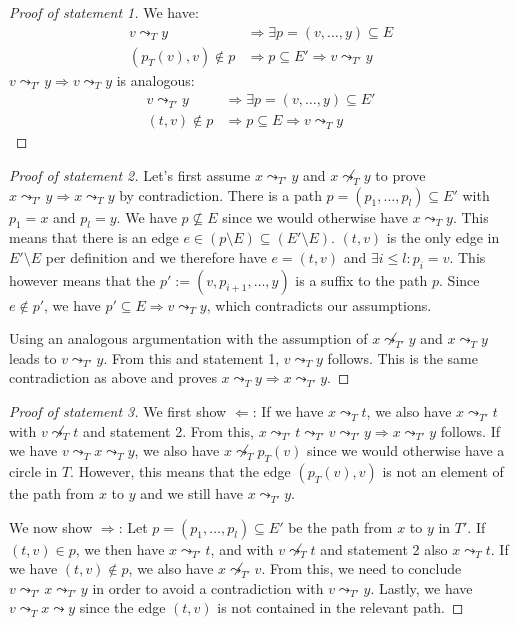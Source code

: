\begin{proof}[Proof of statement 1]
    We have:
    \begin{align*}
        v \leadsto_T y &\Rightarrow \exists p = (v, \dots, y) \subseteq E \\
        (p_T(v), v) \notin p &\Rightarrow p \subseteq E' \Rightarrow v \leadsto_{T'} y
    \end{align*}
    $v \leadsto_{T'} y \Rightarrow v \leadsto_T y$ is analogous:
    \begin{align*}
        v \leadsto_{T'} y &\Rightarrow \exists p = (v, \dots, y) \subseteq E' \\
        (t, v) \notin p &\Rightarrow p \subseteq E \Rightarrow v \leadsto_T y
    \end{align*}
\end{proof}

\begin{proof}[Proof of statement 2]
    Let's first assume $x \leadsto_{T'} y$ and $x \not\leadsto_{T} y$ to prove $x \leadsto_{T'} y \Rightarrow x \leadsto_T y$ by contradiction. There is a path $p = (p_1, \dots, p_l) \subseteq E'$ with $p_1 = x$ and $p_l = y$. We have $p \not\subseteq E$ since we would otherwise have $x \leadsto_T y$. This means that there is an edge $e \in (p \setminus E) \subseteq (E' \setminus E)$. $(t, v)$ is the only edge in $E' \setminus E$ per definition and we therefore have $e = (t, v)$ and $\exists i \leq l: p_i = v$. This however means that the $p' := (v, p_{i+1}, \dots, y)$ is a suffix to the path $p$. Since $e \notin p'$, we have $p' \subseteq E \Rightarrow v \leadsto_{T} y$, which contradicts our assumptions.

    Using an analogous argumentation with the assumption of $x \not\leadsto_{T'} y$ and $x \leadsto_T y$ leads to $v \leadsto_{T'} y$. From this and statement 1, $v \leadsto_T y$ follows. This is the same contradiction as above and proves $x \leadsto_T y \Rightarrow x \leadsto_{T'} y$.
\end{proof}

\begin{proof}[Proof of statement 3]
    We first show $\Leftarrow$: If we have $x \leadsto_T t$, we also have $x \leadsto_{T'} t$ with $v \not\leadsto_T t$ and statement 2. From this, $x \leadsto_{T'} t \leadsto_{T'} v \leadsto_{T'} y \Rightarrow x \leadsto_{T'} y$ follows. If we have $v \leadsto_T x \leadsto_T y$, we also have $x \not\leadsto_T p_T(v)$ since we would otherwise have a circle in $T$. However, this means that the edge $(p_T(v), v)$ is not an element of the path from $x$ to $y$ and we still have $x \leadsto_{T'} y$.

    We now show $\Rightarrow$: Let $p = (p_1, \dots, p_l) \subseteq E'$ be the path from $x$ to $y$ in $T'$. If $(t, v) \in p$, we then have $x \leadsto_{T'} t$, and with $v \not\leadsto_T t$ and statement 2 also $x \leadsto_T t$. If we have $(t, v) \notin p$, we also have $x \not\leadsto_{T'} v$. From this, we need to conclude $v \leadsto_{T'} x \leadsto_{T'} y$ in order to avoid a contradiction with $v \leadsto_{T'} y$. Lastly, we have $v \leadsto_T x \leadsto y$ since the edge $(t, v)$ is not contained in the relevant path.
\end{proof}

